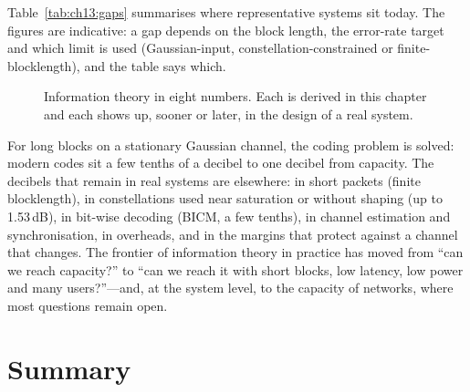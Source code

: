 Table~\ref{tab:ch13:gaps} summarises where representative systems sit today. The figures are
indicative: a gap depends on the block length, the error-rate target and which limit is used
(Gaussian-input, constellation-constrained or finite-blocklength), and the table says which.

\begin{figure}[htbp]\centering
{}
\caption{Information theory in eight numbers. Each is derived in this chapter and each shows up,
sooner or later, in the design of a real system.}
\label{fig:ch13_numbers}
\end{figure}

\begin{keyidea}
For long blocks on a stationary Gaussian channel, the coding problem is solved: modern codes sit a
few tenths of a decibel to one decibel from capacity. The decibels that remain in real systems are
elsewhere: in short packets (finite blocklength), in constellations used near saturation or
without shaping (up to 1.53\,dB), in bit-wise decoding (BICM, a few tenths), in channel estimation
and synchronisation, in overheads, and in the margins that protect against a channel that changes.
The frontier of information theory in practice has moved from ``can we reach capacity?'' to ``can
we reach it with short blocks, low latency, low power and many users?''---and, at the system level,
to the capacity of networks, where most questions remain open.
\end{keyidea}

\section{Summary}

